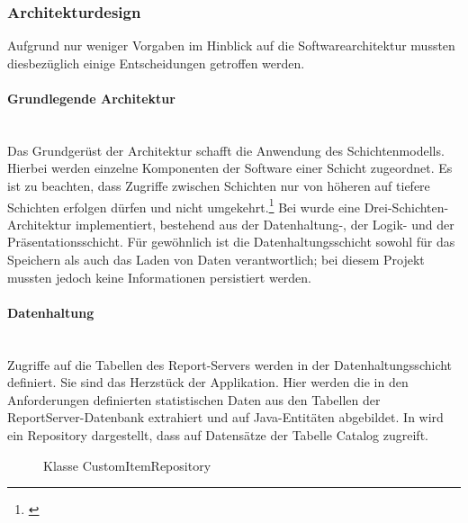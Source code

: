 \subsubsection{Architekturdesign}
\label{sec:Architekturdesign}
Aufgrund nur weniger Vorgaben im Hinblick auf die Softwarearchitektur mussten diesbezüglich einige Entscheidungen getroffen werden.

\paragraph{Grundlegende Architektur} ~\\
\label{p:Architektur}
Das Grundgerüst der Architektur schafft die Anwendung des Schichtenmodells. Hierbei werden einzelne Komponenten der Software einer Schicht zugeordnet. Es ist zu beachten, dass Zugriffe zwischen Schichten nur von höheren auf tiefere Schichten erfolgen dürfen und nicht umgekehrt.\footnote{\Vgl \cite{wiki:arch}}
Bei \projektName wurde eine Drei-Schichten-Architektur implementiert, bestehend aus der Datenhaltung-, der Logik- und der Präsentationsschicht. Für gewöhnlich ist die Datenhaltungsschicht sowohl für das Speichern als auch das Laden von Daten verantwortlich; bei diesem Projekt mussten jedoch keine Informationen persistiert werden.

\paragraph{Datenhaltung} ~\\
\label{p:Datenhaltung}
Zugriffe auf die Tabellen des Report-Servers werden in der Datenhaltungsschicht definiert. Sie sind das Herzstück der Applikation. Hier werden die in den Anforderungen definierten statistischen Daten aus den Tabellen der ReportServer-Datenbank extrahiert und auf Java-Entitäten abgebildet. In  wird ein Repository dargestellt, dass auf Datensätze der Tabelle Catalog zugreift.
\begin{figure}[htb]
	\centering
	\caption{Klasse CustomItemRepository}
	\label{fig:CustomItemRepository}
\end{figure}


